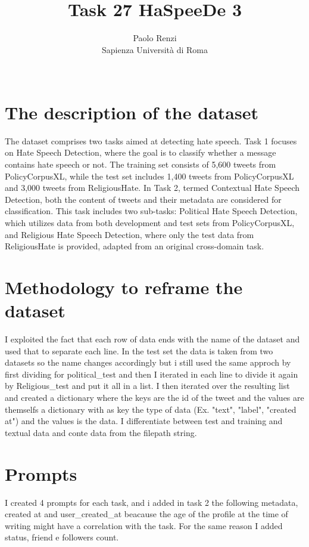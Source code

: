 \documentclass[11pt]{article}
\title{Task 27 HaSpeeDe 3}
\author{Paolo Renzi \\
  Sapienza Università di Roma\\\
  }
\begin{document}
\maketitle

\section{The description of the dataset}

The dataset comprises two tasks aimed at detecting hate speech. Task 1 focuses on Hate Speech Detection, 
where the goal is to classify whether a message contains hate speech or not. The training set consists of 5,600 tweets 
from PolicyCorpusXL, while the test set includes 1,400 tweets from PolicyCorpusXL and 3,000 tweets from ReligiousHate. 
In Task 2, termed Contextual Hate Speech Detection, both the content of tweets and their metadata are considered 
for classification. This task includes two sub-tasks: Political Hate Speech Detection, which utilizes data from both 
development and test sets from PolicyCorpusXL, and Religious Hate Speech Detection, where only the test data 
from ReligiousHate is provided, adapted from an original cross-domain task.

\section{Methodology to reframe the dataset}

I exploited the fact that each row of data ends with the name of the dataset and used that to separate each line. 
In the test set the data is taken from two datasets so the name changes accordingly but i still used the same approch 
by first dividing for political\_test and then I iterated in each line to divide it again by Religious\_test and put it all 
in a list. I then iterated over the resulting list and created a dictionary where the keys are the id of the tweet and 
the values are themselfs a dictionary with as key the type of data (Ex. "text", "label", "created at") and the values is 
the data. I differentiate between test and training and textual data and conte data from the filepath string.


\section{Prompts}

I created 4 prompts for each task, and i added in task 2 the following metadata, created at and user\_created\_at beacause the 
age of the profile at the time of writing might have a correlation with the task. For the same reason I added status, friend
e followers count.
\end{document}
